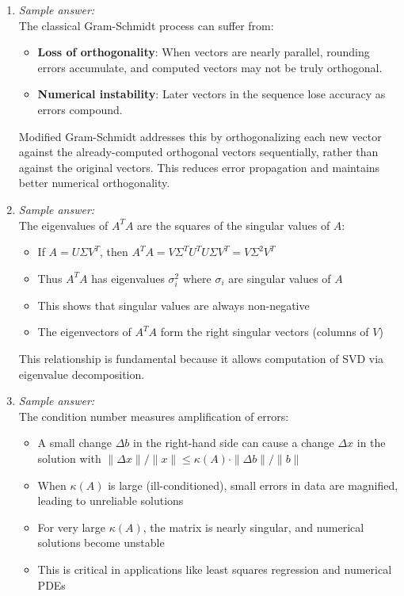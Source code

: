 \documentclass[11pt]{article}
\begin{document}
\begin{enumerate}[label=\textbf{\arabic*.}]
  \item \emph{Sample answer:}\\
  The classical Gram-Schmidt process can suffer from:
  \begin{itemize}
    \item \textbf{Loss of orthogonality}: When vectors are nearly parallel, rounding errors 
    accumulate, and computed vectors may not be truly orthogonal.
    \item \textbf{Numerical instability}: Later vectors in the sequence lose accuracy as errors 
    compound.
  \end{itemize}
  Modified Gram-Schmidt addresses this by orthogonalizing each new vector against the already-computed 
  orthogonal vectors sequentially, rather than against the original vectors. This reduces error 
  propagation and maintains better numerical orthogonality.

  \item \emph{Sample answer:}\\
  The eigenvalues of $A^T A$ are the squares of the singular values of $A$:
  \begin{itemize}
    \item If $A = U\Sigma V^T$, then $A^T A = V\Sigma^T U^T U \Sigma V^T = V\Sigma^2 V^T$
    \item Thus $A^T A$ has eigenvalues $\sigma_i^2$ where $\sigma_i$ are singular values of $A$
    \item This shows that singular values are always non-negative
    \item The eigenvectors of $A^T A$ form the right singular vectors (columns of $V$)
  \end{itemize}
  This relationship is fundamental because it allows computation of SVD via eigenvalue decomposition.

  \item \emph{Sample answer:}\\
  The condition number measures amplification of errors:
  \begin{itemize}
    \item A small change $\Delta b$ in the right-hand side can cause a change $\Delta x$ in 
    the solution with $\|\Delta x\| / \|x\| \leq \kappa(A) \cdot \|\Delta b\| / \|b\|$
    \item When $\kappa(A)$ is large (ill-conditioned), small errors in data are magnified, 
    leading to unreliable solutions
    \item For very large $\kappa(A)$, the matrix is nearly singular, and numerical solutions 
    become unstable
    \item This is critical in applications like least squares regression and numerical PDEs
  \end{itemize}

\end{enumerate}
\end{document}
